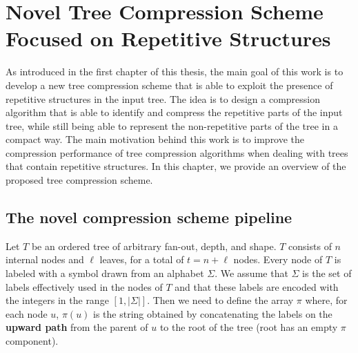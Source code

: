 \chapter{Novel Tree Compression Scheme Focused on Repetitive Structures} \label{chp:project_overview}
As introduced in the first chapter of this thesis, the main goal of this work is to develop a new tree compression scheme that is able to exploit the presence of repetitive structures in the input tree. The idea is to design a compression algorithm that is able to identify and compress the repetitive parts of the input tree, while still being able to represent the non-repetitive parts of the tree in a compact way. The main motivation behind this work is to improve the compression performance of tree compression algorithms when dealing with trees that contain repetitive structures. In this chapter, we provide an overview of the proposed tree compression scheme.

\section{The novel compression scheme pipeline}
Let $ T $ be an ordered tree of arbitrary fan-out, depth, and shape. $ T $ consists of $ n $ internal nodes and $ \ell $ leaves, for a total of $ t = n + \ell $ nodes. Every node of $ T $ is labeled with a symbol drawn from an alphabet $ \Sigma $. We assume that $ \Sigma $ is the set of labels effectively used in the nodes of $T$ and that these labels are encoded with the integers in the range $[1, |\Sigma|]$. Then we need to define the array $\pi$ where, for each node $u$, $\pi(u)$ is the string obtained by concatenating the labels on the \textbf{upward path} from the parent of $u$ to the root of the tree (root has an empty $\pi$ component).

